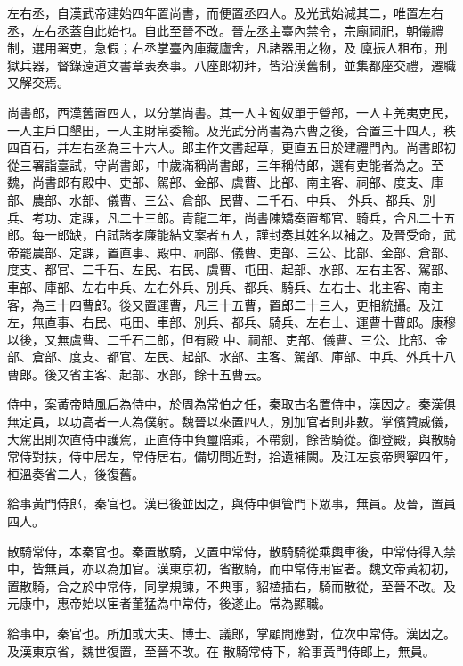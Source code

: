 \begin{pinyinscope}
 左右丞，自漢武帝建始四年置尚書，而便置丞四人。及光武始減其二，唯置左右丞，左右丞蓋自此始也。自此至晉不改。晉左丞主臺內禁令，宗廟祠祀，朝儀禮制，選用署吏，急假；右丞掌臺內庫藏廬舍，凡諸器用之物，及
 廩振人租布，刑獄兵器，督錄遠道文書章表奏事。八座郎初拜，皆沿漢舊制，並集都座交禮，遷職又解交焉。



 尚書郎，西漢舊置四人，以分掌尚書。其一人主匈奴單于營部，一人主羌夷吏民，一人主戶口墾田，一人主財帛委輸。及光武分尚書為六曹之後，合置三十四人，秩四百石，并左右丞為三十六人。郎主作文書起草，更直五日於建禮門內。尚書郎初從三署詣臺試，守尚書郎，中歲滿稱尚書郎，三年稱侍郎，選有吏能者為之。至魏，尚書郎有殿中、吏部、駕部、金部、虞曹、比部、南主客、祠部、度支、庫部、農部、水部、儀曹、三公、倉部、民曹、二千石、中兵、
 外兵、都兵、別兵、考功、定課，凡二十三郎。青龍二年，尚書陳矯奏置都官、騎兵，合凡二十五郎。每一郎缺，白試諸孝廉能結文案者五人，謹封奏其姓名以補之。及晉受命，武帝罷農部、定課，置直事、殿中、祠部、儀曹、吏部、三公、比部、金部、倉部、度支、都官、二千石、左民、右民、虞曹、屯田、起部、水部、左右主客、駕部、車部、庫部、左右中兵、左右外兵、別兵、都兵、騎兵、左右士、北主客、南主客，為三十四曹郎。後又置運曹，凡三十五曹，置郎二十三人，更相統攝。及江左，無直事、右民、屯田、車部、別兵、都兵、騎兵、左右士、運曹十曹郎。康穆以後，又無虞曹、二千石二郎，但有殿
 中、祠部、吏部、儀曹、三公、比部、金部、倉部、度支、都官、左民、起部、水部、主客、駕部、庫部、中兵、外兵十八曹郎。後又省主客、起部、水部，餘十五曹云。



 侍中，案黃帝時風后為侍中，於周為常伯之任，秦取古名置侍中，漢因之。秦漢俱無定員，以功高者一人為僕射。魏晉以來置四人，別加官者則非數。掌儐贊威儀，大駕出則次直侍中護駕，正直侍中負璽陪乘，不帶劍，餘皆騎從。御登殿，與散騎常侍對扶，侍中居左，常侍居右。備切問近對，拾遺補闕。及江左哀帝興寧四年，桓溫奏省二人，後復舊。



 給事黃門侍郎，秦官也。漢已後並因之，與侍中俱管門下眾事，無員。及晉，置員四人。



 散騎常侍，本秦官也。秦置散騎，又置中常侍，散騎騎從乘輿車後，中常侍得入禁中，皆無員，亦以為加官。漢東京初，省散騎，而中常侍用宦者。魏文帝黃初初，置散騎，合之於中常侍，同掌規諫，不典事，貂榼插右，騎而散從，至晉不改。及元康中，惠帝始以宦者董猛為中常侍，後遂止。常為顯職。



 給事中，秦官也。所加或大夫、博士、議郎，掌顧問應對，位次中常侍。漢因之。及漢東京省，魏世復置，至晉不改。在
 散騎常侍下，給事黃門侍郎上，無員。




\end{pinyinscope}
